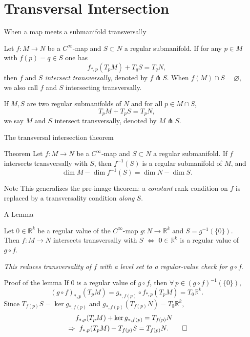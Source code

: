 \documentclass[10pt]{beamer}
\newcommand{\R}{\mathbb{R}}
\begin{document}
\section{Transversal Intersection}

\begin{frame}{When a map meets a submanifold transversally}
	\begin{definition}
		Let $f : M \to N$ be a $C^\infty$-map and $S \subset N$ a
		regular submanifold. If for any $p \in M$ with
		$f(p) = q \in S$ one has
		\[
			f_{*,p}(T_p M) + T_q S = T_q N,
		\]
		then $f$ and $S$ \emph{intersect transversally}, denoted by
		$f \pitchfork S$. When $f(M) \cap S = \varnothing$, we also
		call $f$ and $S$ intersecting transversally.
	\end{definition}
	If $M, S$ are two regular submanifolds of $N$ and for all
	$p \in M \cap S$,
	\[
		T_p M + T_p S = T_p N,
	\]
	we say $M$ and $S$ intersect transversally, denoted by
	$M \pitchfork S$.
\end{frame}

\begin{frame}{The transversal intersection theorem}
	\begin{alertblock}{Theorem}
		Let $f : M \to N$ be a $C^\infty$-map and $S \subset N$ a
		regular submanifold. If $f$ intersects transversally with $S$,
		then $f^{-1}(S)$ is a regular submanifold of $M$, and
		\[
			\dim M - \dim f^{-1}(S) = \dim N - \dim S .
		\]
	\end{alertblock}
	\medskip
	\begin{block}{Note}
		This generalizes the pre-image theorem: a \emph{constant}
		rank condition on $f$ is replaced by a transversality
		condition \emph{along} $S$.
	\end{block}
\end{frame}

\begin{frame}{A Lemma}
	\begin{lemma}
		Let $0 \in \R^k$ be a regular value of the $C^\infty$-map
		$g : N \to \R^k$ and $S = g^{-1}(\{0\})$. Then
		$f : M \to N$ intersects transversally with $S$ $\iff$ $0 \in
			\R^k$ is a regular value of $g \circ f$.
	\end{lemma}
	\emph{This reduces transversality of $f$ with a level set to a
		regular-value check for $g \circ f$.}
\end{frame}

\begin{frame}{Proof of the lemma}
	If $0$ is a regular value of $g \circ f$, then
	$\forall\, p \in (g \circ f)^{-1}(\{0\})$,
	\[
		(g \circ f)_{*,p}(T_p M)
		= g_{*,f(p)} \circ f_{*,p}(T_p M)
		= T_0 \R^k .
	\]
	Since $T_{f(p)} S = \ker g_{*,f(p)}$ and
	$g_{*,f(p)}(T_{f(p)} N) = T_0 \R^k$,
	\begin{align*}
		 & \quad\ f_{*,p}(T_p M) + \ker g_{*,f(p)} = T_{f(p)} N \\
		 & \Rightarrow\
		f_{*,p}(T_p M) + T_{f(p)} S = T_{f(p)} N .
		\qedhere
	\end{align*}
\end{frame}
\end{document}
